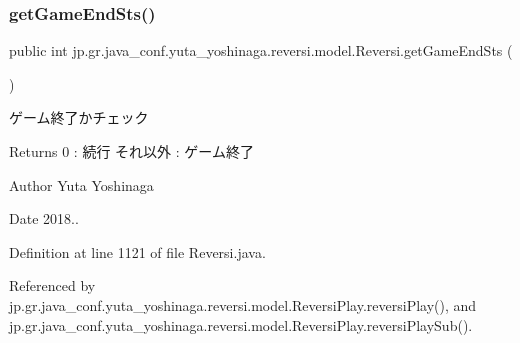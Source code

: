 \subsubsection{\texorpdfstring{get\+Game\+End\+Sts()}{getGameEndSts()}}
{\footnotesize\ttfamily public int jp.\+gr.\+java\+\_\+conf.\+yuta\+\_\+yoshinaga.\+reversi.\+model.\+Reversi.\+get\+Game\+End\+Sts (\begin{DoxyParamCaption}{ }\end{DoxyParamCaption})}



ゲーム終了かチェック 

\begin{DoxyReturn}{Returns}
0 \+: 続行 それ以外 \+: ゲーム終了 
\end{DoxyReturn}
\begin{DoxyAuthor}{Author}
Yuta Yoshinaga 
\end{DoxyAuthor}
\begin{DoxyDate}{Date}
2018.. 
\end{DoxyDate}


Definition at line 1121 of file Reversi.\+java.



Referenced by jp.\+gr.\+java\+\_\+conf.\+yuta\+\_\+yoshinaga.\+reversi.\+model.\+Reversi\+Play.\+reversi\+Play(), and jp.\+gr.\+java\+\_\+conf.\+yuta\+\_\+yoshinaga.\+reversi.\+model.\+Reversi\+Play.\+reversi\+Play\+Sub().

